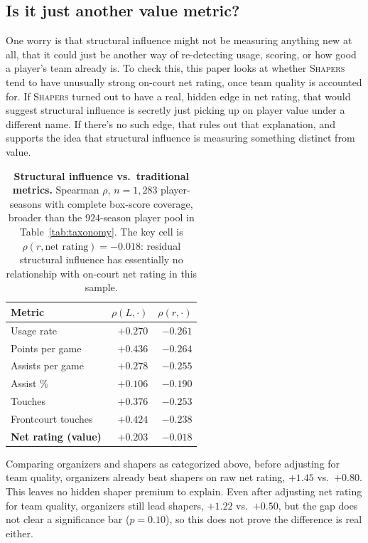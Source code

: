 \documentclass[11pt]{article}
\newcommand{\load}{\ensuremath{L}} %
\newcommand{\resid}{\ensuremath{r}} %
\begin{document}
\subsection{Is it just another value metric?}
\label{sec:orthogonality}

One worry is that structural influence might not be measuring anything new at all, that it
could just be another way of re-detecting usage, scoring, or how good a player's team already
is. To check this, this paper looks at whether \textsc{Shapers} tend to have unusually strong
on-court net rating, once team quality is accounted for. If \textsc{Shapers} turned out to
have a real, hidden edge in net rating, that would suggest structural influence is secretly
just picking up on player value under a different name. If there's no such edge, that rules
out that explanation, and supports the idea that structural influence is measuring something
distinct from value.

\begin{table}[t]
\centering\small
\caption{\textbf{Structural influence vs.\ traditional metrics.} Spearman
$\rho$, $n=1{,}283$ player-seasons with complete box-score coverage, broader than the
$924$-season player pool in Table~\ref{tab:taxonomy}. The key cell is
$\rho(\resid,\text{net rating})=-0.018$: residual structural influence has essentially no
relationship with on-court net rating in this sample.}
\label{tab:ortho}
\begin{tabular}{lrr}
\toprule
Metric & $\rho(\load,\cdot)$ & $\rho(\resid,\cdot)$ \\
\midrule
Usage rate & $+0.270$ & $-0.261$ \\
Points per game & $+0.436$ & $-0.264$ \\
Assists per game & $+0.278$ & $-0.255$ \\
Assist \% & $+0.106$ & $-0.190$ \\
Touches & $+0.376$ & $-0.253$ \\
Frontcourt touches & $+0.424$ & $-0.238$ \\
\textbf{Net rating (value)} & $+0.203$ & $\bm{-0.018}$ \\
\bottomrule
\end{tabular}
\end{table}

Comparing organizers and shapers as categorized above, before adjusting for team quality,
organizers already beat shapers on raw net rating, $+1.45$ vs.\ $+0.80$. This leaves no
hidden shaper premium to explain. Even after adjusting net rating for team quality,
organizers still lead shapers, $+1.22$ vs.\ $+0.50$, but the gap does not clear a
significance bar ($p=0.10$), so this does not prove the difference is real either.
\end{document}
